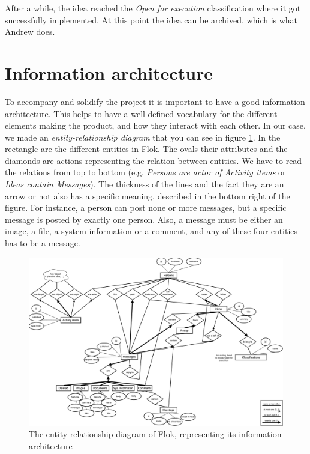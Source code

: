 \documentclass[a4paper,12pt, oneside]{article}
\begin{document}
After a while, the idea reached the \emph{Open for execution} classification where it got successfully implemented.
At this point the idea can be archived, which is what Andrew does.


\section{Information architecture}
To accompany and solidify the project it is important to have a good information architecture.
This helps to have a well defined vocabulary for the different elements making the product, and how they interact with each other.
In our case, we made an \emph{entity-relationship diagram} that you can see in figure \ref{fig.erDiagram}.
In the rectangle are the different entities in Flok.
The ovals their attributes and the diamonds are actions representing the relation between entities.
We have to read the relations from top to bottom (e.g. \emph{Persons are actor of Activity items} or \emph{Ideas contain Messages}).
The thickness of the lines and the fact they are an arrow or not also has a specific meaning, described in the bottom right of the figure.
For instance, a person can post none or more messages, but a specific message is posted by exactly one person.
Also, a message must be either an image, a file, a system information or a comment, and any of these four entities has to be a message.

\begin{figure}
    \centering
    \includegraphics[width=\textwidth]{images/erDiagram.pdf}
    \caption{The entity-relationship diagram of Flok, representing its information architecture}
    \label{fig.erDiagram}
\end{figure}
\end{document}
